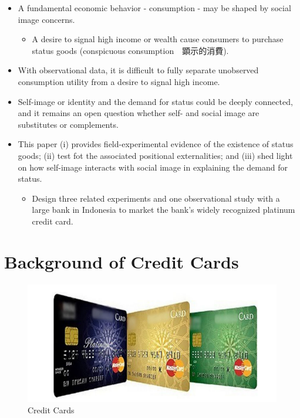 \documentclass[../root]{subfiles}
\begin{document}
    \begin{itemize}
        \item A fundamental economic behavior - consumption - may be shaped by social image concerns.
        \begin{itemize}
            \item A desire to signal high income or wealth cause consumers to purchase status goods (conspicuous consumption　顕示的消費).
        \end{itemize}
        \item With observational data, it is difficult to fully separate unobserved consumption utility from a desire to signal high income.
        \item Self-image or identity and the demand for status could be deeply connected, and it remains an open question whether self- and social image are substitutes or complements.
        \item This paper (i) provides field-experimental evidence of the existence of status goods; (ii) test fot the associated positional externalities; and (iii) shed light on how self-image interacts with social image in explaining the demand for status.
        \begin{itemize}
            \item Design three related experiments and one observational study with a large bank in Indonesia to market the bank's widely recognized platinum credit card.
        \end{itemize} 
    \end{itemize}

    \section{Background of Credit Cards}

    \begin{figure}[h]
        \centering
        \includegraphics[width = 0.7\linewidth]{0717kato/creca.PNG}
        \caption{Credit Cards}
        \label{creca}
    \end{figure}
    
\end{document}
